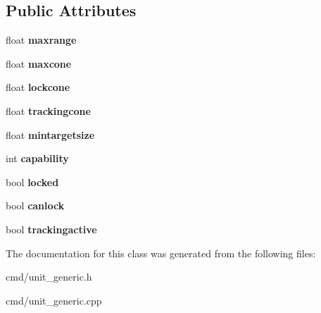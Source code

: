 \subsection*{Public Attributes}
\begin{DoxyCompactItemize}
\item 
float {\bfseries maxrange}\hypertarget{classUnit_1_1Computer_1_1RADARLIM_ab7baa22633114471d29674474450fe6f}{}\label{classUnit_1_1Computer_1_1RADARLIM_ab7baa22633114471d29674474450fe6f}

\item 
float {\bfseries maxcone}\hypertarget{classUnit_1_1Computer_1_1RADARLIM_a25e8b1dd75ff07cd4fdf94a41cf5fc6b}{}\label{classUnit_1_1Computer_1_1RADARLIM_a25e8b1dd75ff07cd4fdf94a41cf5fc6b}

\item 
float {\bfseries lockcone}\hypertarget{classUnit_1_1Computer_1_1RADARLIM_a37a6b97f4edef520fba50f6e8a64b6e6}{}\label{classUnit_1_1Computer_1_1RADARLIM_a37a6b97f4edef520fba50f6e8a64b6e6}

\item 
float {\bfseries trackingcone}\hypertarget{classUnit_1_1Computer_1_1RADARLIM_aa6ab14e44b1331be58219f6dfacc38f5}{}\label{classUnit_1_1Computer_1_1RADARLIM_aa6ab14e44b1331be58219f6dfacc38f5}

\item 
float {\bfseries mintargetsize}\hypertarget{classUnit_1_1Computer_1_1RADARLIM_a87334301095117c8613161efc376c0d1}{}\label{classUnit_1_1Computer_1_1RADARLIM_a87334301095117c8613161efc376c0d1}

\item 
int {\bfseries capability}\hypertarget{classUnit_1_1Computer_1_1RADARLIM_ab2339c550f44a45efd587fbc6e6dc5a0}{}\label{classUnit_1_1Computer_1_1RADARLIM_ab2339c550f44a45efd587fbc6e6dc5a0}

\item 
bool {\bfseries locked}\hypertarget{classUnit_1_1Computer_1_1RADARLIM_a6115f398652c17ddae81fea9b4bd8f5d}{}\label{classUnit_1_1Computer_1_1RADARLIM_a6115f398652c17ddae81fea9b4bd8f5d}

\item 
bool {\bfseries canlock}\hypertarget{classUnit_1_1Computer_1_1RADARLIM_aa3e6fc4cfc137652a3b609e0327317d8}{}\label{classUnit_1_1Computer_1_1RADARLIM_aa3e6fc4cfc137652a3b609e0327317d8}

\item 
bool {\bfseries trackingactive}\hypertarget{classUnit_1_1Computer_1_1RADARLIM_a502bff504043ef72fe6720d77e7fbd39}{}\label{classUnit_1_1Computer_1_1RADARLIM_a502bff504043ef72fe6720d77e7fbd39}

\end{DoxyCompactItemize}


The documentation for this class was generated from the following files\+:\begin{DoxyCompactItemize}
\item 
cmd/unit\+\_\+generic.\+h\item 
cmd/unit\+\_\+generic.\+cpp\end{DoxyCompactItemize}
